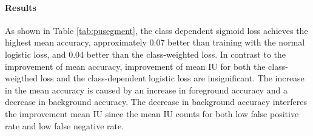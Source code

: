 \paragraph{Results}
As shown in Table \ref{tab:pusegment}, the class dependent sigmoid loss achieves the highest mean accuracy, approximately 0.07 better than training with the normal logistic loss, and 0.04 better than the class-weighted loss.
In contrast to the improvement of mean accuracy, improvement of mean IU for both the class-weigthed loss and the class-dependent logistic loss are insignificant.
The increase in the mean accuracy is caused by an increase in foreground accuracy and a decrease in background accuracy.
The decrease in background accuracy interferes the improvement mean IU since the mean IU counts for both low false positive rate and low false negative rate.



